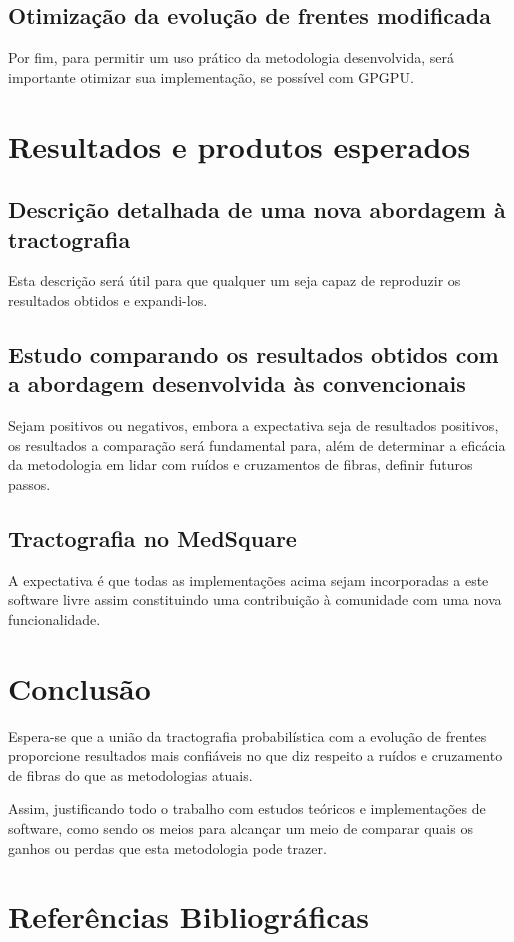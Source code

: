 \documentclass[a4paper,11pt]{report}
\begin{document}
  \section{Otimização da evolução de frentes modificada}
  Por fim, para permitir um uso prático da metodologia desenvolvida, será importante otimizar sua implementação, se possível com GPGPU.

\chapter{Resultados e produtos esperados}
  \section{Descrição detalhada de uma nova abordagem à tractografia}
  Esta descrição será útil para que qualquer um seja capaz de reproduzir os resultados obtidos e expandi-los.
  
  \section{Estudo comparando os resultados obtidos com a abordagem desenvolvida às convencionais}
  Sejam positivos ou negativos, embora a expectativa seja de resultados positivos, os resultados a comparação será fundamental para, além de determinar a eficácia da metodologia em lidar com ruídos e cruzamentos de fibras, definir futuros passos.

  \section{Tractografia no MedSquare}
  A expectativa é que todas as implementações acima sejam incorporadas a este software livre assim constituindo uma contribuição à comunidade com uma nova funcionalidade.

\chapter{Conclusão}
Espera-se que a união da tractografia probabilística com a evolução de frentes proporcione resultados mais confiáveis no que diz respeito a ruídos e cruzamento de fibras do que as metodologias atuais.

Assim, justificando todo o trabalho com estudos teóricos e implementações de software, como sendo os meios para alcançar um meio de comparar quais os ganhos ou perdas que esta metodologia pode trazer.

\chapter{Referências Bibliográficas}
\end{document}
